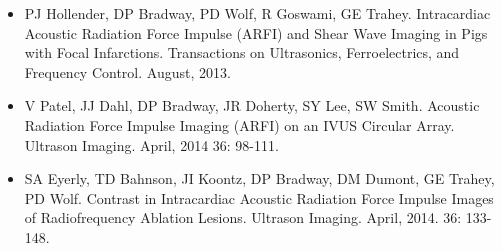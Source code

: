\documentclass[letterpaper,10pt,english]{sphinxmanual}
\begin{document}
\begin{itemize}
\item {} 
PJ Hollender, DP Bradway, PD Wolf, R Goswami, GE Trahey. Intracardiac
Acoustic Radiation Force Impulse (ARFI) and Shear Wave Imaging in
Pigs with Focal Infarctions. Transactions on Ultrasonics,
Ferroelectrics, and Frequency Control. August, 2013.

\item {} 
V Patel, JJ Dahl, DP Bradway, JR Doherty, SY Lee, SW Smith. Acoustic
Radiation Force Impulse Imaging (ARFI) on an IVUS Circular Array.
Ultrason Imaging. April, 2014 36: 98-111.

\item {} 
SA Eyerly, TD Bahnson, JI Koontz, DP Bradway, DM Dumont, GE Trahey,
PD Wolf. Contrast in Intracardiac Acoustic Radiation Force Impulse
Images of Radiofrequency Ablation Lesions. Ultrason Imaging. April,
2014. 36: 133-148.

\end{itemize}
\end{document}
